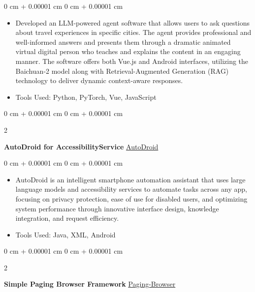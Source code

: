 \documentclass[10pt, letterpaper]{article}
\newenvironment{highlights}{
    \begin{itemize}[
        topsep=0.10 cm,
        parsep=0.10 cm,
        partopsep=0pt,
        itemsep=0pt,
        leftmargin=0 cm + 10pt
    ]
}{
    \end{itemize}
} %
\newenvironment{onecolentry}{
    \begin{adjustwidth}{
        0 cm + 0.00001 cm
    }{
        0 cm + 0.00001 cm
    }
}{
    \end{adjustwidth}
} %
\newenvironment{twocolentry}[2][]{
    \onecolentry
    \def\secondColumn{#2}
    \setcolumnwidth{\fill, 4.5 cm}
    \begin{paracol}{2}
}{
    \switchcolumn \raggedleft \secondColumn
    \end{paracol}
    \endonecolentry
} %
\begin{document}
        \vspace{0.10 cm}
        \begin{onecolentry}
            \begin{highlights}
                \item Developed an LLM-powered agent software that allows users to ask questions about travel experiences in specific cities. The agent provides professional and well-informed answers and presents them through a dramatic animated virtual digital person who teaches and explains the content in an engaging manner. The software offers both Vue.js and Android interfaces, utilizing the Baichuan-2 model along with Retrieval-Augmented Generation (RAG) technology to deliver dynamic context-aware responses.
                \item Tools Used: Python, PyTorch, Vue, JavaScript
            \end{highlights}
        \end{onecolentry}



       \vspace{0.10 cm}
 \begin{twocolentry}{
            \href{https://github.com/WiserZhou/AccessibilityService}{AutoDroid}
        }
            \textbf{AutoDroid for AccessibilityService}\end{twocolentry}

        \vspace{0.10 cm}
        \begin{onecolentry}
            \begin{highlights}
                \item AutoDroid is an intelligent smartphone automation assistant that uses large language models and accessibility services to automate tasks across any app, focusing on privacy protection, ease of use for disabled users, and optimizing system performance through innovative interface design, knowledge integration, and request efficiency.
                \item Tools Used: Java, XML, Android
            \end{highlights}
            
        \end{onecolentry}
\vspace{0.10 cm}
        \begin{twocolentry}{
            \href{https://github.com/WiserZhou/Simple-Paging-Browser-Framework}{Paging-Browser}
        }
            \textbf{Simple Paging Browser Framework}\end{twocolentry}
\end{document}
